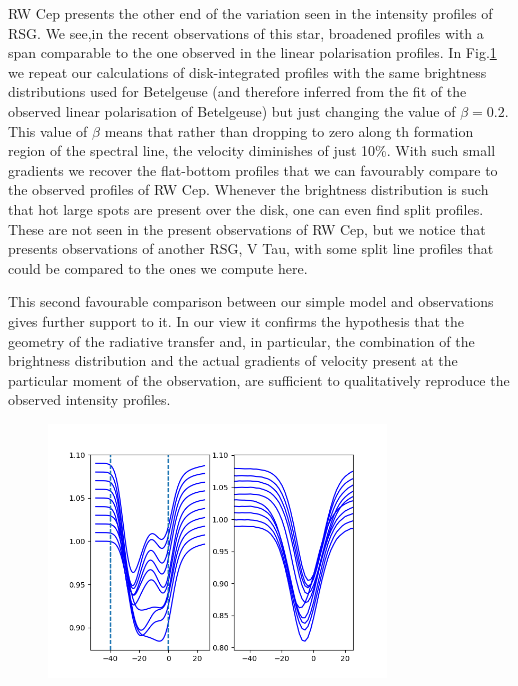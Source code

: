 \documentclass{/Users/art2/TeX/aanda/aa}
\def\kms {km\,s$^{-1}$}
\begin{document}
RW Cep presents the other end of the variation seen in the intensity profiles of RSG. We see,in the recent observations of this star, 
broadened profiles with a span comparable to the one observed in the linear polarisation profiles. In Fig.\ref{RWbeta} we repeat 
our calculations of disk-integrated profiles with the same brightness distributions used for Betelgeuse (and therefore inferred 
from the fit of the observed linear polarisation of Betelgeuse) but just changing the value of $\beta=0.2$. This value of $\beta$ means 
that rather than dropping to zero along th formation region of the spectral line, the velocity diminishes of just 10\%. With such 
small gradients we recover the flat-bottom profiles that we can favourably compare to the observed profiles of RW Cep. Whenever 
the brightness distribution is such that hot large spots are present over the disk, one can even find split profiles. These are not 
seen in the present observations of RW Cep, but we notice that \cite{Kravchenko} presents observations of another RSG, V Tau, with 
some split line profiles that could be compared to the ones we compute here. 

This second favourable comparison between our simple model and observations gives further support to it. In our view it confirms 
the hypothesis that the geometry of the radiative transfer and, in particular, the combination of the brightness distribution and 
the actual gradients of velocity present at the particular moment of the observation, are sufficient to qualitatively reproduce 
the observed intensity profiles. 

\begin{figure}
   \includegraphics[width=0.8\textwidth]{Fig1_Nadira2.png}
   \caption{ }
   \label{RWbeta}
   \end{figure}
\end{document}
